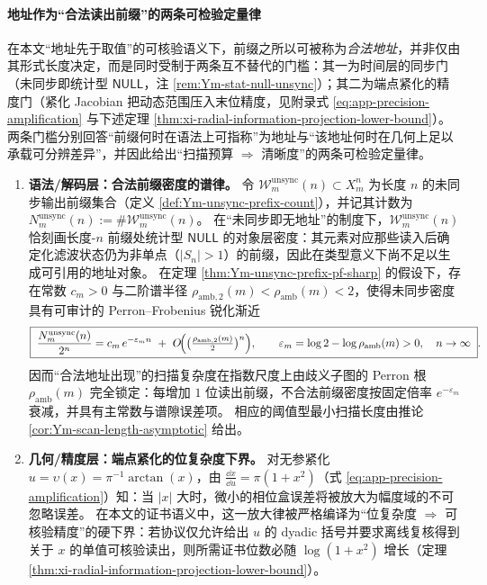 \paragraph{地址作为“合法读出前缀”的两条可检验定量律}\label{par:xi-legal-readout-prefix-two-laws}
在本文“地址先于取值”的可核验语义下，前缀之所以可被称为\emph{合法地址}，并非仅由其形式长度决定，而是同时受制于两条互不替代的门槛：其一为时间层的同步门（未同步即统计型 \(\mathsf{NULL}\)，注 \ref{rem:Ym-stat-null-unsync}）；其二为端点紧化的精度门（紧化 Jacobian 把动态范围压入末位精度，见附录式 \eqref{eq:app-precision-amplification} 与下述定理 \ref{thm:xi-radial-information-projection-lower-bound}）。
两条门槛分别回答“前缀何时在语法上可指称”为地址与“该地址何时在几何上足以承载可分辨差异”，并因此给出“扫描预算 \(\Rightarrow\) 清晰度”的两条可检验定量律。
\begin{enumerate}
  \item \textbf{语法/解码层：合法前缀密度的谱律。}
  令 \(\mathcal{W}_{m}^{\mathrm{unsync}}(n)\subset X_m^n\) 为长度 \(n\) 的未同步输出前缀集合（定义 \ref{def:Ym-unsync-prefix-count}），并记其计数为 \(N_m^{\mathrm{unsync}}(n):=\#\mathcal{W}_{m}^{\mathrm{unsync}}(n)\)。
  在“未同步即无地址”的制度下，\(\mathcal{W}_{m}^{\mathrm{unsync}}(n)\) 恰刻画长度-\(n\) 前缀处统计型 \(\mathsf{NULL}\) 的对象层密度：其元素对应那些读入后确定化滤波状态仍为非单点（\(|S_n|>1\)）的前缀，因此在类型意义下尚不足以生成可引用的地址对象。
  在定理 \ref{thm:Ym-unsync-prefix-pf-sharp} 的假设下，存在常数 \(c_m>0\) 与二阶谱半径 \(\rho_{\mathrm{amb},2}(m)<\rho_{\mathrm{amb}}(m)<2\)，使得未同步密度具有可审计的 Perron--Frobenius 锐化渐近
  \begin{equation}\label{eq:xi-unsync-prefix-density-pf-law}
  \boxed{\;
  \frac{N_m^{\mathrm{unsync}}(n)}{2^n}
  =c_m\,e^{-\varepsilon_m n}\ +\ O\!\Bigl(\bigl(\tfrac{\rho_{\mathrm{amb},2}(m)}{2}\bigr)^n\Bigr),
  \qquad
  \varepsilon_m=\log 2-\log\rho_{\mathrm{amb}}(m)>0,\quad n\to\infty\; }.
  \end{equation}
  因而“合法地址出现”的扫描复杂度在指数尺度上由歧义子图的 Perron 根 \(\rho_{\mathrm{amb}}(m)\) 完全锁定：每增加 \(1\) 位读出前缀，不合法前缀密度按固定倍率 \(e^{-\varepsilon_m}\) 衰减，并具有主常数与谱隙误差项。
  相应的阈值型最小扫描长度由推论 \ref{cor:Ym-scan-length-asymptotic} 给出。
  \item \textbf{几何/精度层：端点紧化的位复杂度下界。}
  对无参紧化 \(u=\upsilon(x)=\pi^{-1}\arctan(x)\)，由 \(\frac{\dd x}{\dd u}=\pi(1+x^2)\)（式 \eqref{eq:app-precision-amplification}）知：当 \(|x|\) 大时，微小的相位盒误差将被放大为幅度域的不可忽略误差。
  在本文的证书语义中，这一放大律被严格编译为“位复杂度 \(\Rightarrow\) 可核验精度”的硬下界：若协议仅允许给出 \(u\) 的 dyadic 括号并要求离线复核得到关于 \(x\) 的单值可核验读出，则所需证书位数必随 \(\log(1+x^2)\) 增长（定理 \ref{thm:xi-radial-information-projection-lower-bound}）。
\end{enumerate}

